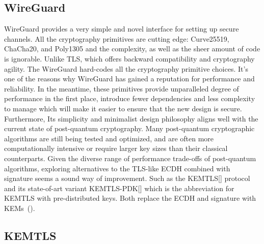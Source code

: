 \subsection{WireGuard}
WireGuard provides a very simple and novel interface for setting up secure channels. All the cryptography primitives are cutting edge: Curve25519, ChaCha20, and Poly1305 and the complexity, as well as the sheer amount of code is ignorable. Unlike TLS, which offers backward compatibility and cryptography agility. The WireGuard hard-codes all the cryptography primitive choices. It's one of the reasons why WireGuard has gained a reputation for performance and reliability. In the meantime, these primitives provide unparalleled degree of performance in the first place, introduce fewer dependencies and less complexity to manage which will make it easier to ensure that the new design is secure. Furthermore, Its simplicity and minimalist design philosophy aligns well with the current state of post-quantum cryptography. Many post-quantum cryptographic algorithms are still being tested and optimized, and are often more computationally intensive or require larger key sizes than their classical counterparts. Given the diverse range of performance trade-offs of post-quantum algorithms, exploring alternatives to the TLS-like ECDH combined with signature seems a sound way of improvement. Such as the KEMTLS[] protocol and its state-of-art variant KEMTLS-PDK[] which is the abbreviation for KEMTLS with pre-distributed keys. Both replace the ECDH and signature with KEMs~(\cite{strunk}). 
\subsection{KEMTLS}
